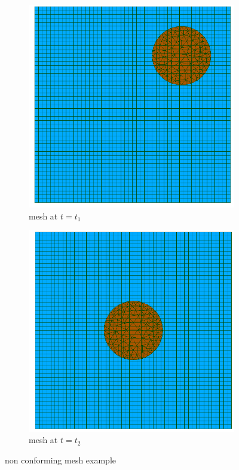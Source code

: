 \begin{figure}[htbp!]
	\centering
	\begin{subfigure}{.5\textwidth}
		\centering
		\includegraphics[width=.9\linewidth]{images/nonconf1c}
		\caption{mesh at $t=t_1$}
		\label{fig:nc1}
	\end{subfigure}%
	\begin{subfigure}{.5\textwidth}
		\centering
		\includegraphics[width=.9\linewidth]{images/nonconf2c}
		\caption{mesh at $t=t_2$}
		\label{fig:nc2}
	\end{subfigure}
	\caption{non conforming mesh example}
	\label{fig:nonconf-mesh}
\end{figure}


